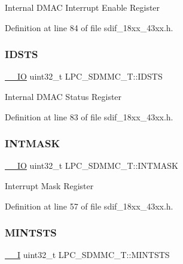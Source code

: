 Internal D\+M\+AC Interrupt Enable Register 

Definition at line 84 of file sdif\+\_\+18xx\+\_\+43xx.\+h.

\mbox{\label{struct_l_p_c___s_d_m_m_c___t_ad50c21091e980af7e8dd0a5eb4f75d4c}} 
\subsubsection{\texorpdfstring{I\+D\+S\+TS}{IDSTS}}
{\footnotesize\ttfamily \hyperlink{core__sc300_8h_aec43007d9998a0a0e01faede4133d6be}{\+\_\+\+\_\+\+IO} uint32\+\_\+t L\+P\+C\+\_\+\+S\+D\+M\+M\+C\+\_\+\+T\+::\+I\+D\+S\+TS}

Internal D\+M\+AC Status Register 

Definition at line 83 of file sdif\+\_\+18xx\+\_\+43xx.\+h.

\mbox{\label{struct_l_p_c___s_d_m_m_c___t_ac9490973ed0dba888c9c93fc9468211f}} 
\subsubsection{\texorpdfstring{I\+N\+T\+M\+A\+SK}{INTMASK}}
{\footnotesize\ttfamily \hyperlink{core__sc300_8h_aec43007d9998a0a0e01faede4133d6be}{\+\_\+\+\_\+\+IO} uint32\+\_\+t L\+P\+C\+\_\+\+S\+D\+M\+M\+C\+\_\+\+T\+::\+I\+N\+T\+M\+A\+SK}

Interrupt Mask Register 

Definition at line 57 of file sdif\+\_\+18xx\+\_\+43xx.\+h.

\mbox{\label{struct_l_p_c___s_d_m_m_c___t_a31e290eb9859754f735bf9fa36e507ca}} 
\subsubsection{\texorpdfstring{M\+I\+N\+T\+S\+TS}{MINTSTS}}
{\footnotesize\ttfamily \hyperlink{core__sc300_8h_af63697ed9952cc71e1225efe205f6cd3}{\+\_\+\+\_\+I} uint32\+\_\+t L\+P\+C\+\_\+\+S\+D\+M\+M\+C\+\_\+\+T\+::\+M\+I\+N\+T\+S\+TS}

